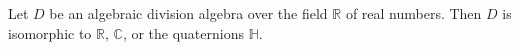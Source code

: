 Let $D$ be an algebraic division algebra over the field $\mathbb{R}$ of real numbers. Then $D$ is isomorphic to $\mathbb{R}$, $\mathbb{C}$, or the quaternions $\mathbb{H}$.
